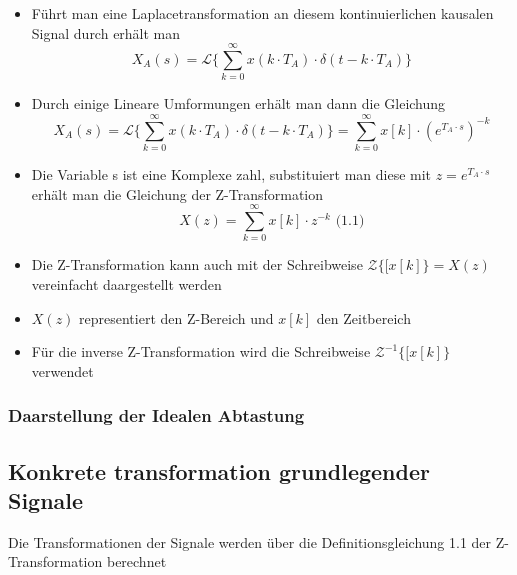 \documentclass[11pt]{article}
\providecommand{\tightlist}{%
      \setlength{\itemsep}{0pt}\setlength{\parskip}{0pt}}
\begin{document}
    \begin{itemize}
\tightlist
\item
  Führt man eine Laplacetransformation an diesem kontinuierlichen
  kausalen Signal durch erhält man
  \[X_A(s) = \mathcal{L}\{\sum_{k=0}^\infty x( k \cdot T_A ) \cdot \delta ( t - k \cdot T_A )\}\label{eq:xAs}\]
\end{itemize}

    \begin{itemize}
\tightlist
\item
  Durch einige Lineare Umformungen erhält man dann die Gleichung
  \[X_A(s) = \mathcal{L}\{\sum_{k=0}^\infty x( k \cdot T_A ) \cdot \delta ( t - k \cdot T_A )\} = \sum_{k=0}^\infty x[k] \cdot (e^{T_A \cdot s})^{-k}\label{eq:LxAk}\]
\end{itemize}

    \begin{itemize}
\tightlist
\item
  Die Variable s ist eine Komplexe zahl, substituiert man diese mit
  \(z = e^{T_A \cdot s}\label{eq:Zsubs}\) erhält man die Gleichung der
  Z-Transformation
  \[X(z) = \sum_{k=0}^\infty x[k] \cdot z^{-k}\textrm{  (1.1)}\]
\end{itemize}

    \begin{itemize}
\item
  Die Z-Transformation kann auch mit der Schreibweise
  \(\mathcal{Z}\{[x[k]\} = X(z)\) vereinfacht daargestellt werden
\item
  \(X(z)\) representiert den Z-Bereich und \(x[k]\) den Zeitbereich
\item
  Für die inverse Z-Transformation wird die Schreibweise
  \({\mathcal{Z}}^{-1}\{[x[k]\}\) verwendet
\end{itemize}

    \subsubsection{Daarstellung der Idealen
Abtastung}\label{daarstellung-der-idealen-abtastung}

    \subsection{Konkrete transformation grundlegender
Signale}\label{konkrete-transformation-grundlegender-signale}

Die Transformationen der Signale werden über die Definitionsgleichung
1.1 der Z-Transformation berechnet
\end{document}

